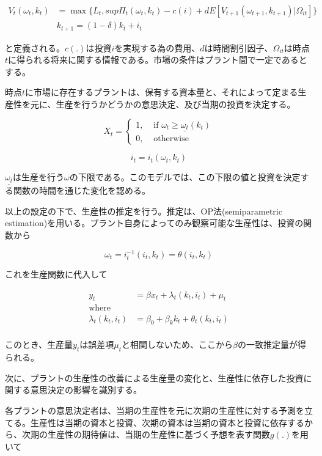 \documentclass{jsarticle}
\begin{document}
\begin{enumerate}
 \begin{align*}
 V_t (\omega_t, k_t) &= \max \{L_t, sup \Pi_t(\omega_t, k_t) -c(i) + 
 				      d E[V_{t+1} (\omega_{t+1}, k_{t+1})| \Omega_{it}] \} \\
  & k_{t+1} = (1- \delta)k_t + i_t
 \end{align*}

と定義される。$c(.)$は投資$i$を実現する為の費用、$d$は時間割引因子、$\Omega_{it}$は時点$t$に得られる将来に関する情報である。市場の条件はプラント間で一定であるとする。

時点$t$に市場に存在するプラントは、保有する資本量と、それによって定まる生産性を元に、生産を行うかどうかの意思決定、及び当期の投資を決定する。

\[X_{t} = \begin{cases}
1, & \text{ if } \omega_t \geq \underline{\omega_{t}} (k_t) \\
0, & \text{ otherwise}
\end{cases} \]

\[i_t = i_t(\omega_t, k_t) \]

$\underline{\omega_{t}}$は生産を行う$\omega$の下限である。このモデルでは、この下限の値と投資を決定する関数の時間を通じた変化を認める。

\vspace{1zw}

以上の設定の下で、生産性の推定を行う。推定は、OP法(semiparametric estimation)を用いる。プラント自身によってのみ観察可能な生産性は、投資の関数から

\[ \omega_t = i^{-1}_t (i_t, k_t) = \theta (i_t, k_t) \]

これを生産関数に代入して

 \begin{align*}
 y_{t} &= \beta x_t + \lambda_t(k_t, i_t) + \mu_t \\
 \text{where} \\
 \lambda_t (k_t, i_t) &= \beta_0 + \beta_k k_t + \theta_t (k_t, i_t) \\
 \end{align*}

このとき、生産量$y_t$は誤差項$\mu_t$と相関しないため、ここから$\beta$の一致推定量が得られる。

次に、プラントの生産性の改善による生産量の変化と、生産性に依存した投資に関する意思決定の影響を識別する。

各プラントの意思決定者は、当期の生産性を元に次期の生産性に対する予測を立てる。生産性は当期の資本と投資、次期の資本は当期の資本と投資に依存するから、次期の生産性の期待値は、当期の生産性に基づく予想を表す関数$g(.)$を用いて


\end{enumerate}
\end{document}
